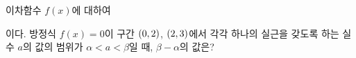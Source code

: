이차함수 $f(x)$에 대하여\par\smallskip{}\par\smallskip\noindent 이다. 방정식 $f(x)=0$이 구간 $(0{,}\mkern3mu\mathopen{}2)$, $(2{,}\mkern3mu\mathopen{}3)$에서 각각 하나의 실근을 갖도록 하는 실수 $a$의 값의 범위가 $\alpha<a<\beta$일 때, $\beta-\alpha$의 값은?
